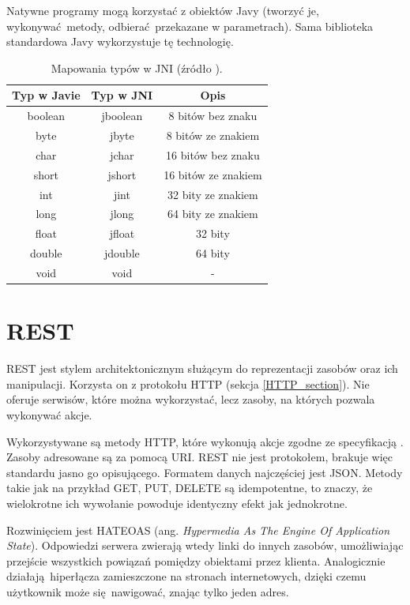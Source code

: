 Natywne programy mogą korzystać z obiektów Javy (tworzyć je, wykonywać metody, odbierać przekazane w parametrach). Sama biblioteka standardowa Javy wykorzystuje tę technologię.

\begin{table}[h!]
  \centering
  \begin{tabular}{|c|c|c|}
    \hline
    \textbf{Typ w Javie} & \textbf{Typ w JNI} & \textbf{Opis} \\ [0.5ex]
    \hline
    boolean & jboolean & 8 bitów bez znaku \\
    byte & jbyte & 8 bitów ze znakiem \\
    char & jchar & 16 bitów bez znaku \\
    short & jshort & 16 bitów ze znakiem \\
    int & jint & 32 bity ze znakiem \\
    long & jlong & 64 bity ze znakiem \\
    float & jfloat & 32 bity \\
    double & jdouble & 64 bity \\
    void & void & - \\ [1ex]
    \hline
  \end{tabular}
  \caption{Mapowania typów w JNI (źródło \cite{JNI17}).}
\end{table}


\section{REST}

REST jest stylem architektonicznym służącym do reprezentacji zasobów oraz ich manipulacji. Korzysta on z protokołu HTTP (sekcja \ref{HTTP_section}). Nie oferuje serwisów, które można wykorzystać, lecz zasoby, na których pozwala wykonywać akcje.

Wykorzystywane są metody HTTP, które wykonują akcje zgodne ze specyfikacją \cite{RFC7231}. Zasoby adresowane są za pomocą URI. REST nie jest protokołem, brakuje więc standardu jasno go opisującego. Formatem danych najczęściej jest JSON. Metody takie jak na przykład GET, PUT, DELETE są idempotentne, to znaczy, że wielokrotne ich wywołanie powoduje identyczny efekt jak jednokrotne.

Rozwinięciem jest HATEOAS (ang. \textit{Hypermedia As The Engine Of Application State}). Odpowiedzi serwera zwierają wtedy linki do innych zasobów, umożliwiając przejście wszystkich powiązań pomiędzy obiektami przez klienta. Analogicznie działają hiperłącza zamieszczone na stronach internetowych, dzięki czemu użytkownik może się nawigować, znając tylko jeden adres.

